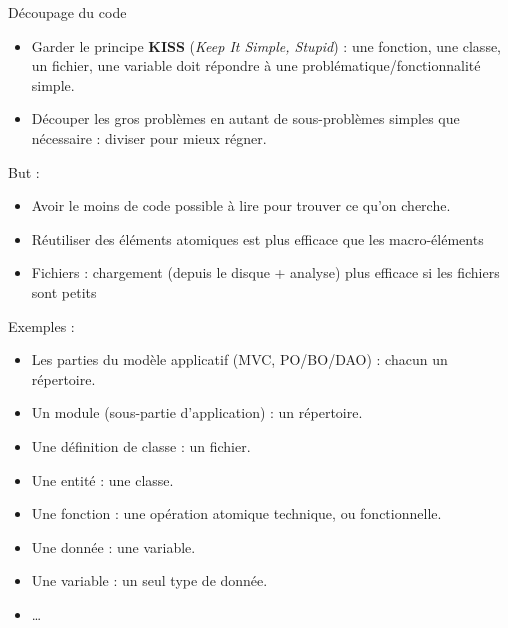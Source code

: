 \begin{frame}{Découpage du code}
	\begin{itemize}
		\item Garder le principe \textbf{KISS} (\emph{Keep It Simple, Stupid}) : une fonction, une classe, un fichier, une variable doit répondre à une problématique/fonctionnalité simple.
		\item Découper les gros problèmes en autant de sous-problèmes simples que nécessaire : diviser pour mieux régner.
	\end{itemize}
	But : 
	\begin{itemize}
		\item Avoir le moins de code possible à lire pour trouver ce qu’on cherche.
		\item Réutiliser des éléments atomiques est plus efficace que les macro-éléments
		\item Fichiers : chargement (depuis le disque + analyse) plus efficace si les fichiers sont petits
	\end{itemize}
	Exemples :
	\begin{itemize}
		\item Les parties du modèle applicatif (MVC, PO/BO/DAO) : chacun un répertoire.
		\item Un module (sous-partie d’application) : un répertoire.
		\item Une définition de classe : un fichier.
		\item Une entité : une classe.
		\item Une fonction : une opération atomique technique, ou fonctionnelle.
		\item Une donnée : une variable.
		\item Une variable : un seul type de donnée.
		\item \ldots
	\end{itemize}
\end{frame}

